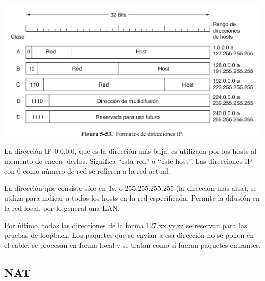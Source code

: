 	\begin{center}
		\includegraphics[scale=0.3]{./imagenes/clasesIP.png} 
	\end{center}	
	La dirección IP 0.0.0.0, que es la dirección más baja, es utilizada por los hosts al momento de encen-
derlos. Significa “esta red” o “este host”. Las direcciones IP con 0 como número de red se refieren a la
red actual.
	\par La dirección que
consiste sólo en 1s, o 255.255.255.255 (la dirección más alta), se utiliza para indicar a todos los hosts
en la red especificada. Permite la difusión en la red local, por lo general una LAN.
	\par Por último, todas
las direcciones de la forma 127.xx.yy.zz se reservan para las pruebas de loopback. Los paquetes que se
envían a esa dirección no se ponen en el cable; se procesan en forma local y se tratan como si fueran
paquetes entrantes.
	\subsection{NAT}
	
